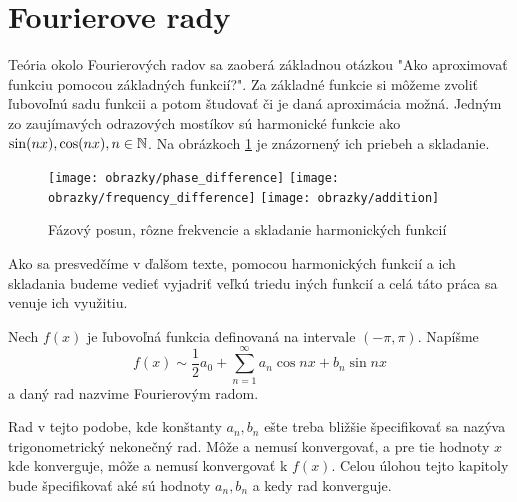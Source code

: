 \section{Fourierove rady}

Teória okolo Fourierových radov sa zaoberá základnou otázkou "Ako
aproximovať funkciu pomocou základných funkcií?".
Za základné funkcie si môžeme zvoliť ľubovoľnú sadu funkcii a potom
študovať či je daná aproximácia možná. Jedným zo zaujímavých
odrazových mostíkov sú harmonické funkcie ako $\sin(n x), \cos(nx), n
\in \mathbb{N}$.
Na obrázkoch \ref{fig:harmonic_illustration} je znázornený ich priebeh a skladanie.

\begin{figure}[htp]
    \centering
    \texttt{[image: obrazky/phase\_difference]}
    \texttt{[image: obrazky/frequency\_difference]}
    \texttt{[image: obrazky/addition]}
    \caption{Fázový posun, rôzne frekvencie a skladanie harmonických
    funkcií}\label{fig:harmonic_illustration}
\end{figure}

Ako sa presvedčíme v ďalšom texte, pomocou harmonických funkcií a ich
skladania budeme vedieť vyjadriť veľkú triedu iných funkcií a celá
táto práca sa venuje ich využitiu.

\begin{definicia} Nech $f(x)$ je ľubovoľná funkcia definovaná na
intervale $(-\pi,\pi)$. Napíšme
    \begin{equation}
        f(x) \sim \frac{1}{2} a_0 + \sum_{n=1}^{\infty} a_n
        \cos n x + b_n \sin n x
    \label{eq:trig_series}
    \end{equation}
a daný rad nazvime Fourierovým radom.
\end{definicia}

Rad v tejto podobe, kde konštanty $a_n, b_n$ ešte treba bližšie
špecifikovať sa nazýva trigonometrický nekonečný rad. Môže a nemusí
konvergovať, a pre tie hodnoty $x$ kde konverguje, môže a nemusí
konvergovať k $f(x)$. Celou úlohou tejto kapitoly bude špecifikovať
aké sú hodnoty $a_n, b_n$ a kedy rad konverguje.


